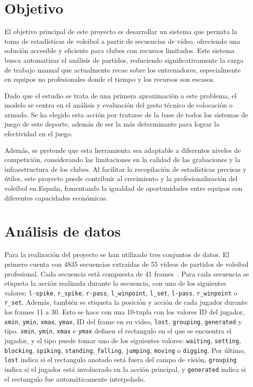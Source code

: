 \documentclass[12pt]{report} %
\begin{document}
    
    \chapter{Objetivo}
    \label{chap:metodos}

    El objetivo principal de este proyecto es desarrollar un sistema que
    permita la toma de estadísticas de voleibol a partir de secuencias de
    vídeo, ofreciendo una solución accesible y eficiente para clubes con
    recursos limitados. Este sistema busca automatizar el análisis de partidos,
    reduciendo significativamente la carga de trabajo manual que actualmente
    recae sobre los entrenadores, especialmente en equipos no profesionales
    donde el tiempo y los recursos son escasos.

    Dado que el estudio se trata de una primera aproximación a este problema,
    el modelo se centra en el análisis y evaluación del gesto técnico de
    colocación o armado. Se ha elegido esta acción por tratarse de la base de
    todos los sistemas de juego de este deporte, además de ser la más
    determinante para lograr la efectividad en el juego.

    Además, se pretende que esta herramienta sea adaptable a diferentes niveles de
    competición, considerando las limitaciones en la calidad de las grabaciones y
    la infraestructura de los clubes. Al facilitar la recopilación de estadísticas
    precisas y útiles, este proyecto puede contribuir al crecimiento y la
    profesionalización del voleibol en España, fomentando la igualdad de
    oportunidades entre equipos con diferentes capacidades económicas.


    \chapter{Análisis de datos}
    \label{cahp:datos}
    Para la realización del proyecto se han utilizado tres conjuntos de datos.
    El primero cuenta con 4835 secuencias extraídas de 55 vídeos
    de partidos de voleibol profesional. Cada secuencia está compuesta de 41
    frames~\cite{dataset1}. 
    Para cada secuencia se etiqueta la acción realizada durante
    la secuencia, con uno de los siguientes valores: \verb!l-spike!,
    \verb!r_spike!, \verb!r-pass!, \verb!l_winpoint!, \verb!l_set!,
    \verb!l-pass!, \verb!r_winpoint! o \verb!r_set!. Además, también se etiqueta
    la posición y acción de cada jugador durante los frames 11 a 30. Esto se
    hace con una 10-tupla con los valores ID del jugador, \verb!xmin!,
    \verb!ymin!, \verb!xmax!, \verb!ymax!, ID del frame en su video,
    \verb!lost!, \verb!grouping!, \verb!generated! y tipo. \verb!xmin!,
    \verb!ymin!, \verb!xmax! e \verb!ymax! definen el rectangulo en el que se
    encuentra el jugador, y el tipo puede tomar uno de los siguientes valores:
    \verb!waiting!, \verb!setting!, \verb!blocking!, \verb!spiking!,
    \verb!standing!, \verb!falling!, \verb!jumping!, \verb!moving! o
    \verb!digging!. Por último, \verb!lost! indica si el rectangulo anotado está
    fuera del campo de visión, \verb!grouping! indica si el jugador está
    involucrado en la acción principal, y \verb!generated! indica si el
    rectangulo fue automáticamente interpolado.
\end{document}
